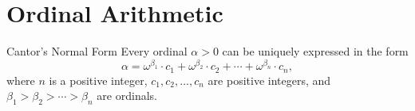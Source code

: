 \section{Ordinal Arithmetic} %

\begin{theorem}{Cantor's Normal Form} %
    Every ordinal \(\alpha > 0\) can be uniquely expressed in the form
    \[
        \alpha = \omega^{\beta_1} \cdot c_1 + \omega^{\beta_2} \cdot c_2 + \cdots + \omega^{\beta_n} \cdot c_n,
    \]
    where \(n\) is a positive integer, \(c_1, c_2, \ldots, c_n\) are positive integers, 
    and \(\beta_1 > \beta_2 > \cdots > \beta_n\) are ordinals.
\end{theorem}
